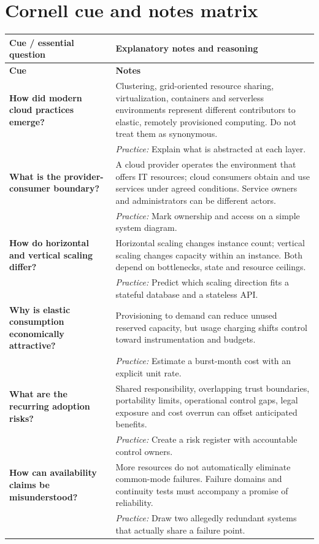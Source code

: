 \documentclass[10pt,letterpaper]{article}
\begin{document}
\section{Cornell cue and notes matrix}
\small\setlength{\LTleft}{0pt}\setlength{\LTright}{0pt plus 1fill}
\begin{longtable}{>{\RaggedRight\arraybackslash}p{}>{\RaggedRight\arraybackslash}p{}}
\toprule\textbf{Cue / essential question}&\textbf{Explanatory notes and reasoning}\\\midrule\endfirsthead\toprule\textbf{Cue}&\textbf{Notes}\\\midrule\endhead
\textbf{How did modern cloud practices emerge?} & Clustering, grid-oriented resource sharing, virtualization, containers and serverless environments represent different contributors to elastic, remotely provisioned computing. Do not treat them as synonymous.\\[3pt]& \textcolor{petrol}{\emph{Practice:} Explain what is abstracted at each layer.}\\[8pt]\midrule
\textbf{What is the provider-consumer boundary?} & A cloud provider operates the environment that offers IT resources; cloud consumers obtain and use services under agreed conditions. Service owners and administrators can be different actors.\\[3pt]& \textcolor{petrol}{\emph{Practice:} Mark ownership and access on a simple system diagram.}\\[8pt]\midrule
\textbf{How do horizontal and vertical scaling differ?} & Horizontal scaling changes instance count; vertical scaling changes capacity within an instance. Both depend on bottlenecks, state and resource ceilings.\\[3pt]& \textcolor{petrol}{\emph{Practice:} Predict which scaling direction fits a stateful database and a stateless API.}\\[8pt]\midrule
\textbf{Why is elastic consumption economically attractive?} & Provisioning to demand can reduce unused reserved capacity, but usage charging shifts control toward instrumentation and budgets.\\[3pt]& \textcolor{petrol}{\emph{Practice:} Estimate a burst-month cost with an explicit unit rate.}\\[8pt]\midrule
\textbf{What are the recurring adoption risks?} & Shared responsibility, overlapping trust boundaries, portability limits, operational control gaps, legal exposure and cost overrun can offset anticipated benefits.\\[3pt]& \textcolor{petrol}{\emph{Practice:} Create a risk register with accountable control owners.}\\[8pt]\midrule
\textbf{How can availability claims be misunderstood?} & More resources do not automatically eliminate common-mode failures. Failure domains and continuity tests must accompany a promise of reliability.\\[3pt]& \textcolor{petrol}{\emph{Practice:} Draw two allegedly redundant systems that actually share a failure point.}\\[8pt]\midrule
\end{longtable}\normalsize
\end{document}
